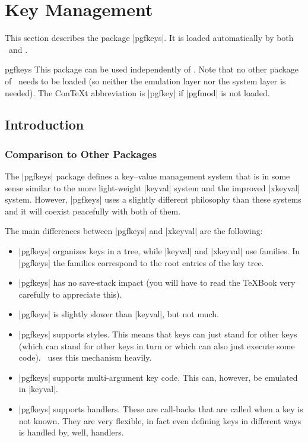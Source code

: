 %
%
%


\section{Key Management}
\label{section-keys}

This section describes the package |pgfkeys|. It is loaded
automatically by both \pgfname\ and \tikzname.

\begin{package}{pgfkeys}
  This package can be used independently of \pgfname. Note that no
  other package of \pgfname\ needs to be loaded (so neither the
  emulation layer nor the system layer is needed). The Con\TeX t
  abbreviation is |pgfkey| if |pgfmod| is not loaded.
\end{package}



\subsection{Introduction}

\subsubsection{Comparison to Other Packages}

The |pgfkeys| package defines a key--value management system that is in
some sense similar to the more light-weight |keyval| system and the
improved |xkeyval| system. However, |pgfkeys| uses a slightly
different philosophy than these systems and it will coexist peacefully
with both of them.

The main differences between |pgfkeys| and |xkeyval| are the
following:

\begin{itemize}
\item |pgfkeys| organizes keys in a tree, while |keyval| and |xkeyval|
  use families. In |pgfkeys| the families correspond to the root
  entries of the key tree.
\item |pgfkeys| has no save-stack impact (you will have to read the
  \TeX Book very carefully to appreciate this).
\item |pgfkeys| is slightly slower than |keyval|, but not much.
\item |pgfkeys| supports styles. This means that keys can just stand
  for other keys (which can stand for other keys in turn or which can
  also just execute some code). \tikzname\ uses this mechanism heavily.
\item |pgfkeys| supports multi-argument key code. This can, however,
  be emulated in |keyval|.
\item |pgfkeys| supports handlers. These are call-backs that are
  called when a key is not known. They are very flexible, in fact even
  defining keys in different ways is handled by, well, handlers.
\end{itemize}



